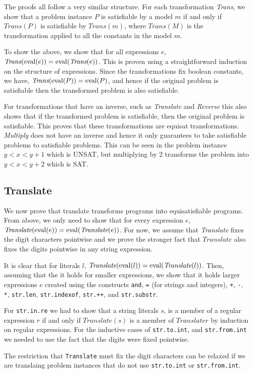 The proofs all follow a very similar structure. For each transformation
\textit{Trans}, we show that a problem instance $P$ is satisfiable by a model $m$
if and only if $\textit{Trans}(P)$ is satisfiable by $\textit{Trans}(m)$, where
$\textit{Trans}(M)$ is the transformation applied to all the constants in the
model $m$.

To show the above, we show that for all expressions $e$, $\textit{Trans}(\operatorname{eval}
(e)) = \operatorname{eval} (\textit{Trans}(e))$. This is proven using a straightforward
induction on the structure of expressions. Since the transformations fix
boolean constants, we have, $\textit{Trans}(\operatorname{eval} (P)) = \operatorname{eval} (P)$, and hence
if the original problem is satisfiable then the transformed problem is also
satisfiable.

For transformations that have an inverse, such as \textit{Translate}
and \textit{Reverse} this also shows that if the transformed problem is
satisfiable, then the original problem is satisfiable. This proves that these
transformations are equisat transformations. \textit{Multiply} does not have an
inverse and hence it only guarantees to take satisfiable problems to satisfiable
problems. This can be seen in the problem instance $y<x<y+1$ which is UNSAT, but
multiplying by 2 transforms the problem into $y<x<y+2$ which is SAT.

\subsection{Translate}
We now prove that translate transforms programs into equisatisfiable
programs. From above, we only need to show that for every expression $e$,
$\textit{Translate}(\operatorname{eval} (e)) = \operatorname{eval} (\textit{Translate}(e))$. For now, we
assume that \textit{Translate} fixes the digit characters pointwise and we prove
the stronger fact that $\textit{Translate}$ also fixes the digits pointwise in
any string expression.

It is clear that for literals $l$, $\textit{Translate}(\operatorname{eval} (l)) = \operatorname{eval}
(\textit{Translate}(l))$. Then, assuming that the it holds for smaller
expressions, we show that it holds larger expressions $e$ created using the
constructs \texttt{and}, \texttt{=} (for strings and integers), \texttt{+},
\texttt{-}, \texttt{*}, \texttt{str.len}, \texttt{str.indexof}, \texttt{str.++},
and \texttt{str.substr}.

For \texttt{str.in.re} we had to show that a string literals $s$, is a member of
a regular expression $r$ if and only if $\textit{Translate}(s)$ is a member of
$\textit{Translate}{r}$ by induction on regular expressions. For the inductive
cases of \texttt{str.to.int}, and \texttt{str.from.int} we needed to use the
fact that the digits were fixed pointwise.

The restriction that \texttt{Translate} must fix the digit characters can be
relaxed if we are translaing problem instances that do not use
\texttt{str.to.int} or \texttt{str.from.int}.

